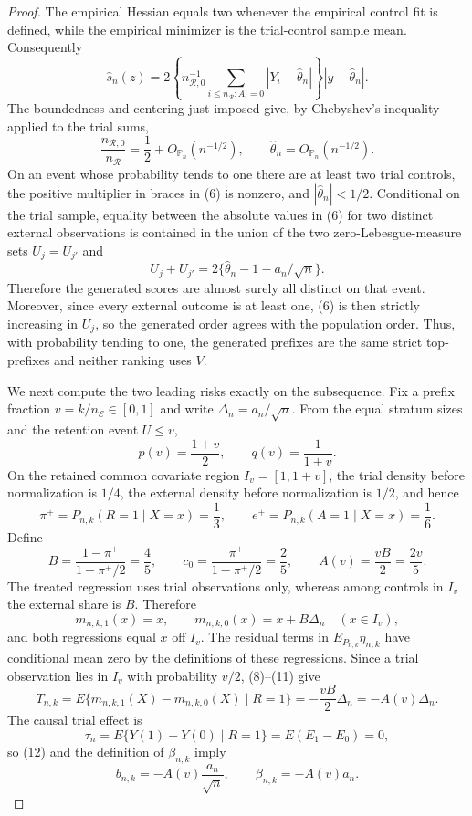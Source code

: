 \documentclass{article}
\begin{document}
\begin{proof}
The empirical Hessian equals two whenever the empirical control fit is defined, while the empirical minimizer is the trial-control sample mean.  Consequently
\[
 \widehat s_n(z)=
 2\left\{n_{\mathcal R,0}^{-1}
 \sum_{i\leq n_{\mathcal R}:A_i=0}|Y_i-\widehat\theta_n|\right\}
 |y-\widehat\theta_n|.
 \tag{6}
\]
The boundedness and centering just imposed give, by Chebyshev's inequality applied to the trial sums,
\[
 \frac{n_{\mathcal R,0}}{n_{\mathcal R}}=\frac12+O_{\mathbb P_n}(n^{-1/2}),
 \qquad
 \widehat\theta_n=O_{\mathbb P_n}(n^{-1/2}).
 \tag{7}
\]
On an event whose probability tends to one there are at least two trial controls, the positive multiplier in braces in (6) is nonzero, and \(|\widehat\theta_n|<1/2\).  Conditional on the trial sample, equality between the absolute values in (6) for two distinct external observations is contained in the union of the two zero-Lebesgue-measure sets \(U_j=U_{j'}\) and
\[
 U_j+U_{j'}=2\{\widehat\theta_n-1-a_n/\sqrt n\}.
\]
Therefore the generated scores are almost surely all distinct on that event.  Moreover, since every external outcome is at least one, (6) is then strictly increasing in \(U_j\), so the generated order agrees with the population order.  Thus, with probability tending to one, the generated prefixes are the same strict top-prefixes and neither ranking uses \(V\).

We next compute the two leading risks exactly on the subsequence.  Fix a prefix fraction \(v=k/n_{\mathcal E}\in[0,1]\) and write \(\Delta_n=a_n/\sqrt n\).  From the equal stratum sizes and the retention event \(U\leq v\),
\[
 p(v)=\frac{1+v}{2},
 \qquad q(v)=\frac1{1+v}.
 \tag{8}
\]
On the retained common covariate region \(I_v=[1,1+v]\), the trial density before normalization is \(1/4\), the external density before normalization is \(1/2\), and hence
\[
 \pi^+=P_{n,k}(R=1\mid X=x)=\frac13,
 \qquad e^+=P_{n,k}(A=1\mid X=x)=\frac16.
 \tag{9}
\]
Define
\[
 B=\frac{1-\pi^+}{1-\pi^+/2}=\frac45,
 \qquad c_0=\frac{\pi^+}{1-\pi^+/2}=\frac25,
 \qquad A(v)=\frac{vB}{2}=\frac{2v}{5}.
 \tag{10}
\]
The treated regression uses trial observations only, whereas among controls in \(I_v\) the external share is \(B\).  Therefore
\[
 m_{n,k,1}(x)=x,
 \qquad
 m_{n,k,0}(x)=x+B\Delta_n\quad(x\in I_v),
 \tag{11}
\]
and both regressions equal \(x\) off \(I_v\).  The residual terms in \(E_{P_{n,k}}\eta_{n,k}\) have conditional mean zero by the definitions of these regressions.  Since a trial observation lies in \(I_v\) with probability \(v/2\), (8)--(11) give
\[
 T_{n,k}
 =E\{m_{n,k,1}(X)-m_{n,k,0}(X)\mid R=1\}
 =-\frac{vB}{2}\Delta_n
 =-A(v)\Delta_n.
 \tag{12}
\]
The causal trial effect is
\[
 \tau_n=E\{Y(1)-Y(0)\mid R=1\}=E(E_1-E_0)=0,
\]
so (12) and the definition of \(\beta_{n,k}\) imply
\[
 b_{n,k}=-A(v)\frac{a_n}{\sqrt n},
 \qquad \beta_{n,k}=-A(v)a_n.
 \tag{13}
\]


\end{proof}
\end{document}
